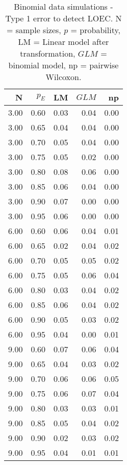 \begin{table}[H]
\centering
\caption{Binomial data simulations - Type 1 error to detect LOEC. N = sample sizes, 
             $p$ = probability, LM = Linear model after transformation, 
             $GLM$ = binomial model, np = pairwise Wilcoxon.} 
\label{tab:t1_loec_p}
{\footnotesize
\begin{tabular}{rrrrr}
  \hline
N & $p_E$ & LM & $GLM$ & np \\ 
  \hline
3.00 & 0.60 & 0.03 & 0.04 & 0.00 \\ 
  3.00 & 0.65 & 0.04 & 0.04 & 0.00 \\ 
  3.00 & 0.70 & 0.05 & 0.04 & 0.00 \\ 
  3.00 & 0.75 & 0.05 & 0.02 & 0.00 \\ 
  3.00 & 0.80 & 0.08 & 0.06 & 0.00 \\ 
  3.00 & 0.85 & 0.06 & 0.04 & 0.00 \\ 
  3.00 & 0.90 & 0.07 & 0.00 & 0.00 \\ 
  3.00 & 0.95 & 0.06 & 0.00 & 0.00 \\ 
  6.00 & 0.60 & 0.06 & 0.04 & 0.01 \\ 
  6.00 & 0.65 & 0.02 & 0.04 & 0.02 \\ 
  6.00 & 0.70 & 0.05 & 0.05 & 0.02 \\ 
  6.00 & 0.75 & 0.05 & 0.06 & 0.04 \\ 
  6.00 & 0.80 & 0.03 & 0.04 & 0.02 \\ 
  6.00 & 0.85 & 0.06 & 0.04 & 0.02 \\ 
  6.00 & 0.90 & 0.05 & 0.03 & 0.02 \\ 
  6.00 & 0.95 & 0.04 & 0.00 & 0.01 \\ 
  9.00 & 0.60 & 0.07 & 0.06 & 0.04 \\ 
  9.00 & 0.65 & 0.04 & 0.03 & 0.02 \\ 
  9.00 & 0.70 & 0.06 & 0.06 & 0.05 \\ 
  9.00 & 0.75 & 0.06 & 0.07 & 0.04 \\ 
  9.00 & 0.80 & 0.03 & 0.03 & 0.01 \\ 
  9.00 & 0.85 & 0.05 & 0.04 & 0.02 \\ 
  9.00 & 0.90 & 0.02 & 0.03 & 0.02 \\ 
  9.00 & 0.95 & 0.04 & 0.01 & 0.01 \\ 
   \hline
\end{tabular}
}
\end{table}
